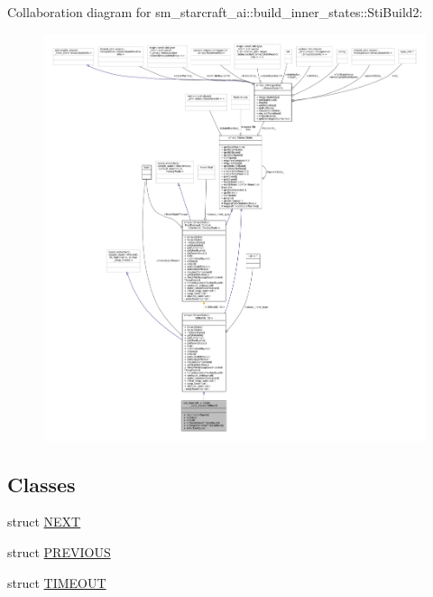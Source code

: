 Collaboration diagram for sm\+\_\+starcraft\+\_\+ai\+:\+:build\+\_\+inner\+\_\+states\+:\+:Sti\+Build2\+:
\nopagebreak
\begin{figure}[H]
\begin{center}
\leavevmode
\includegraphics[width=350pt]{structsm__starcraft__ai_1_1build__inner__states_1_1StiBuild2__coll__graph}
\end{center}
\end{figure}
\subsection*{Classes}
\begin{DoxyCompactItemize}
\item 
struct \hyperlink{structsm__starcraft__ai_1_1build__inner__states_1_1StiBuild2_1_1NEXT}{N\+E\+XT}
\item 
struct \hyperlink{structsm__starcraft__ai_1_1build__inner__states_1_1StiBuild2_1_1PREVIOUS}{P\+R\+E\+V\+I\+O\+US}
\item 
struct \hyperlink{structsm__starcraft__ai_1_1build__inner__states_1_1StiBuild2_1_1TIMEOUT}{T\+I\+M\+E\+O\+UT}
\end{DoxyCompactItemize}

